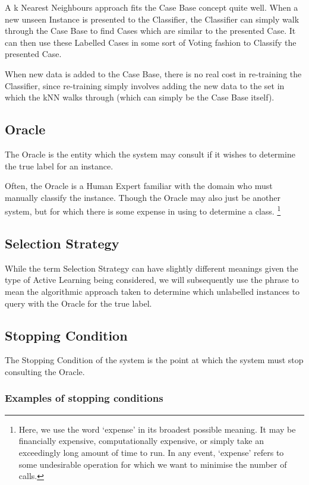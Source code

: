 \documentclass[a4paper,11pt]{report}
\begin{document}
A k Nearest Neighbours approach fits the Case Base concept quite well. When a new unseen Instance is presented to the Classifier, the Classifier can simply walk through the Case Base to find Cases which are similar to the presented Case. It can then use these Labelled Cases in some sort of Voting fashion to Classify the presented Case.

When new data is added to the Case Base, there is no real cost in re-training the Classifier, since re-training simply involves adding the new data to the set in which the kNN walks through (which can simply be the Case Base itself).

\subsection{Oracle}
The Oracle is the entity which the system may consult if it wishes to determine the true label for an instance.

Often, the Oracle is a Human Expert familiar with the domain who must manually classify the instance. Though the Oracle may also just be another system, but for which there is some expense in using to determine a class. \footnote{Here, we use the word `expense' in its broadest possible meaning. It may be financially expensive, computationally expensive, or simply take an exceedingly long amount of time to run. In any event, `expense' refers to some undesirable operation for which we want to minimise the number of calls.}

\subsection{Selection Strategy}
While the term Selection Strategy can have slightly different meanings given the type of Active Learning being considered, we will subsequently use the phrase to mean the algorithmic approach taken to determine which unlabelled instances to query with the Oracle for the true label.

\subsection{Stopping Condition}
The Stopping Condition of the system is the point at which the system must stop consulting the Oracle.

\subsubsection{Examples of stopping conditions}
\end{document}
